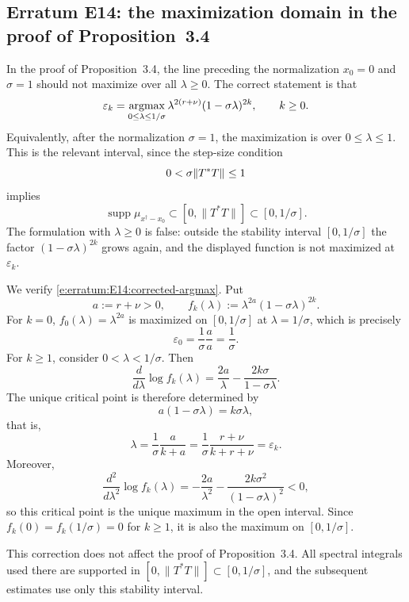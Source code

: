 
\subsection*{Erratum E14: the maximization domain in the proof of Proposition~3.4}
\label{s:erratum:E14}

In the proof of Proposition~3.4, the line preceding the
normalization $x_0=0$ and $\sigma=1$ should not maximize over all
$\lambda\geq0$.  The correct statement is that
\begin{align}
\label{e:erratum:E14:corrected-argmax}
        \varepsilon_k
        =
        \mathop{\mathrm{argmax}}_{0\leq \lambda\leq 1/\sigma}
        \lambda^{2(r+\nu)}(1-\sigma\lambda)^{2k},
        \qquad k\geq0 .
\end{align}
Equivalently, after the normalization $\sigma=1$, the maximization is over
$0\leq\lambda\leq1$.  This is the relevant interval, since the step-size
condition
\[
        0 < \sigma \| T^* T \|_{  } \leq 1
\]
implies
\[
        \operatorname{supp}\mu_{x^\dag-x_0}
        \subset [0,\|T^*T\|]
        \subset [0,1/\sigma].
\]
The formulation with $\lambda\geq0$ is false: outside the stability
interval $[0,1/\sigma]$ the factor $(1-\sigma\lambda)^{2k}$ grows again,
and the displayed function is not maximized at $\varepsilon_k$.

We verify \eqref{e:erratum:E14:corrected-argmax}.  Put
\[
        a:=r+\nu>0,
        \qquad
        f_k(\lambda)
        :=
        \lambda^{2a}(1-\sigma\lambda)^{2k} .
\]
For $k=0$, $f_0(\lambda)=\lambda^{2a}$ is maximized on
$[0,1/\sigma]$ at $\lambda=1/\sigma$, which is precisely
\[
        \varepsilon_0
        =
        \frac{1}{\sigma}\frac{a}{a}
        =
        \frac{1}{\sigma} .
\]
For $k\geq1$, consider $0<\lambda<1/\sigma$.  Then
\[
        \frac{d}{d\lambda}\log f_k(\lambda)
        =
        \frac{2a}{\lambda}
        -
        \frac{2k\sigma}{1-\sigma\lambda} .
\]
The unique critical point is therefore determined by
\[
        a(1-\sigma\lambda)=k\sigma\lambda,
\]
that is,
\[
        \lambda
        =
        \frac{1}{\sigma}\frac{a}{k+a}
        =
        \frac{1}{\sigma}\frac{r+\nu}{k+r+\nu}
        =
        \varepsilon_k .
\]
Moreover,
\[
        \frac{d^2}{d\lambda^2}\log f_k(\lambda)
        =
        -\frac{2a}{\lambda^2}
        -
        \frac{2k\sigma^2}{(1-\sigma\lambda)^2}
        <0,
\]
so this critical point is the unique maximum in the open interval.  Since
$f_k(0)=f_k(1/\sigma)=0$ for $k\geq1$, it is also the maximum on
$[0,1/\sigma]$.

This correction does not affect the proof of Proposition~3.4.  All
spectral integrals used there are supported in
$[0,\|T^*T\|]\subset[0,1/\sigma]$, and the subsequent estimates use
only this stability interval.
